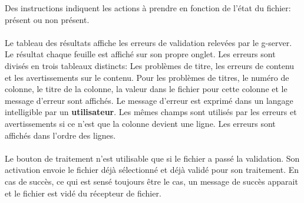 Des instructions indiquent les actions à prendre en fonction de l'état du fichier: présent ou non présent. %

\paragraph{}
Le tableau des résultats affiche les erreurs de validation relevées par le \gls{g-server}.
Le résultat chaque feuille est affiché sur son propre onglet.
Les erreurs sont divisés en trois tableaux distincts: Les problèmes de titre, les erreurs de contenu et les avertissements sur le contenu.
Pour les problèmes de titres, le numéro de colonne, le titre de la colonne, la valeur dans le fichier pour cette colonne et le message d'erreur sont affichés.
Le message d'erreur est exprimé dans un langage intelligible par un \textbf{utilisateur}.
Les mêmes champs sont utilisés par les erreurs et avertissements si ce n'est que la colonne devient une ligne.
Les erreurs sont affichés dans l'ordre des lignes.

\paragraph{}
Le bouton de traitement n'est utilisable que si le fichier a passé la validation.
Son activation envoie le fichier déjà sélectionné et déjà validé pour son traitement.
En cas de succès, ce qui est sensé toujours être le cas, un message de succès apparait et le fichier est vidé du récepteur de fichier.
